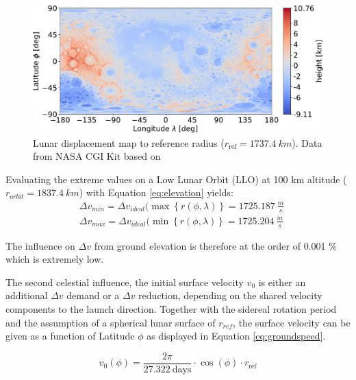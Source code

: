 \documentclass[utf8]{FrontiersinHarvard} %
\begin{document}
\begin{figure}[h!]
\begin{center}
\includegraphics[width=\linewidth]{img/heightmap.pdf}
\end{center}
\caption{Lunar displacement map to reference radius ($r_{\mathrm{ref}}=1737.4 \ km$). Data from NASA CGI Kit \citep{nasaSVSMoon} based on \citep{LRO.2015}}
\label{fig:heightmap}
\end{figure}

Evaluating the extreme values on a Low Lunar Orbit (LLO) at 100 km altitude ($r_{orbit}=1837.4 \ km$) with Equation \ref{eq:elevation} yields:
\begin{equation*}
\begin{array}{ll}
     &  \Delta v_{min}=\Delta v_{ideal}(\max \left \{  r(\phi,\lambda) \right \}= 1725.187 \ \frac{m}{s}\\
     &  \Delta v_{max}=\Delta v_{ideal}(\min \left \{  r(\phi,\lambda) \right \}= 1725.204 \ \frac{m}{s}
\end{array}
\label{eq:heightmap_dv}
\end{equation*}

The influence on $\Delta v$ from ground elevation is therefore at the order of 0.001 \% which is extremely low.

The second celestial influence, the initial surface velocity $v_{0}$ is either an additional $\Delta v$ demand or a $\Delta v$ reduction, depending on the shared velocity components to the launch direction.
Together with the sidereal rotation period and the assumption of a spherical lunar surface of $r_{ref}$, the surface velocity can be given as a function of Latitude $\phi$ as displayed in Equation \ref{eq:groundspeed}.

\begin{equation}
\displaystyle v_{0}(\phi) = \frac{2\pi}{27.322 \ \mathrm{days}} \cdot \cos (\phi) \cdot  r_{\mathrm{ref}}
\label{eq:groundspeed}
\end{equation}
\end{document}
